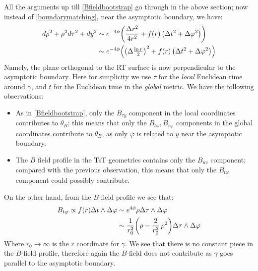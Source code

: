 \documentclass[11pt,a4paper]{article}
\def\vp{\varphi}
\def\dd{\Delta}
\def\we{\wedge}
\begin{document}
All the arguments up till \eqref{Bfieldbootstrap} go through in the above section; now instead of \eqref{boundarymatching}, near the asymptotic boundary, we have:
\begin{equation}
\begin{aligned}
	d\rho^2 + \rho^2 d\tau^2 + dy^2
	&\sim e^{-4\phi} \pqty{
			\frac{\dd{r}^2}{4r^2}
			+ f(r)\,\pqty{\dd{t}^2 + \dd{\varphi}^2}
		} \\
	&\sim e^{-4\phi} \pqty{
			\pqty{\dd{\tfrac{\ln r}{2}}}^2
			+ f(r)\,\pqty{\dd{t}^2 + \dd{\varphi}^2}
		} \\
\end{aligned}
\end{equation}
Namely, the plane orthogonal to the RT surface is now perpendicular to the asymptotic boundary. 
Here for simplicity we use $\tau$ for the \textit{local} Euclidean time around $\gamma$, and $t$ for the Euclidean time in the \textit{global} metric. We have the following observations:
\begin{itemize}
\item As in \eqref{Bfieldbootstrap}, only the $B_{\tau y}$ component in the local coordinates contributes to $\theta_B$; this means that only the $B_{t\vp}, B_{r\vp}$ components in the global coordinates contribute to $\theta_B$, as only $\varphi$ is related to $y$ near the asymptotic boundary.

\item The $B$ field profile in the TsT geometries contains only the $B_{uv}$ component; compared with the previous observation, this means that only the $B_{t\vp}$ component could possibly contribute. 
\end{itemize}
On the other hand, from the $B$-field profile we see that:
\begin{equation}
\begin{aligned}
	B_{t\varphi}
	\propto f(r) \dd{t} \we \dd{\vp}
	&\sim e^{4\phi} \rho \dd{\tau} \we \dd{\vp} \\
	&\sim \frac{1}{r_0^2} \pqty{
			\rho - \frac{2}{r_0^2}\,\rho^2
		} \dd{\tau} \we \dd{\vp} \\
\end{aligned}
\end{equation}
Where $r_0 \to \infty$ is the $r$ coordinate for $\gamma$. We see that there is no constant piece in the $B$-field profile, therefore again the $B$-field does not contribute as $\gamma$ goes parallel to the asymptotic boundary. 















\end{document}
